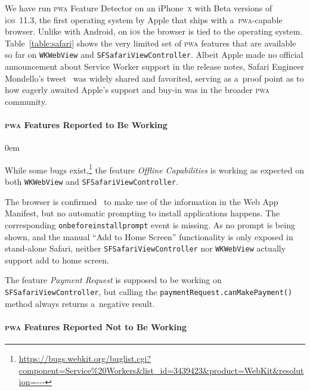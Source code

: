 \documentclass[sigconf]{acmart}
\begin{document}
We have run \textsc{pwa} Feature Detector on an iPhone~\textsc{x}
with Beta versions of i\textsc{os}~11.3,
the first operating system by Apple that ships with a~\textsc{pwa}-capable browser.
Unlike with Android, on i\textsc{os} the browser is tied to the operating system.
Table~\ref{table:safari} shows the very limited set of \textsc{pwa} features
that are available so far on \texttt{WKWebView} and \texttt{SFSafariViewController}.
Albeit Apple made no official announcement about Service Worker support in the release notes,
Safari Engineer Mondello's tweet~\cite{mondello2018safari} was widely shared and favorited,
serving as a~proof point as to how eagerly awaited Apple's support and buy-in
was in the broader \textsc{pwa} community.

\paragraph{\textsc{pwa} Features Reported to Be Working}

\begin{description}
  \itemsep0em 
  \item[Offline Capabilities] While some bugs
    exist,\footnote{\url{https://bugs.webkit.org/buglist.cgi?component=Service\%20Workers&list_id=3439423&product=WebKit&resolution=---}} the feature \emph{Offline Capabilities}
    is working as expected on both \texttt{WKWebView} and \texttt{SFSafariViewController}.
  \item[Add to Home Screen] The browser is confirmed~\cite{mondello2018safari}
    to make use of the information in the Web App Manifest,
    but no automatic prompting to install applications happens.
    The corresponding \texttt{onbeforeinstallprompt} event is missing.
    As no prompt is being shown, and the manual ``Add to Home Screen'' functionality
    is only exposed in stand-alone Safari, neither \texttt{SFSafariViewController} nor \texttt{WKWebView}
    actually support add to home screen.
  \item[Payment Request] The feature \emph{Payment Request} is supposed
    to be working on \texttt{SFSafariViewController}, but calling the \texttt{paymentRequest.canMakePayment()}
    method always returns a~negative result.
\end{description} 

\paragraph{\textsc{pwa} Features Reported Not to Be Working} \leavevmode \newline
\end{document}
